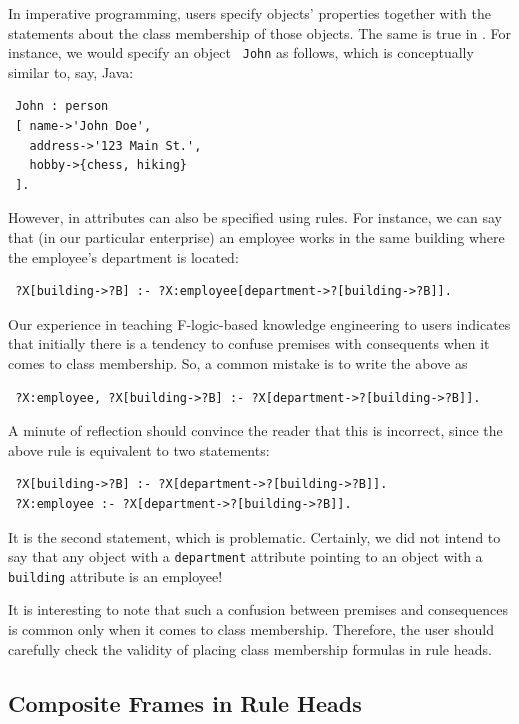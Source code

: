 \documentclass[11pt]{article}
\newcommand{\ERGO}{\mbox{\smaller{\ensuremath{\cal{E}}\smaller{{\sc{RGO}}}}}\xspace}
\newcommand{\FLSYSTEM}{\ERGO}
\begin{document}
In imperative programming, users specify objects' properties together with
the statements about the class membership of those objects.
The same is true in \FLSYSTEM. For instance, we would specify an object {\tt
  John} as follows, which is conceptually similar to, say, Java:
\begin{verbatim}
 John : person
 [ name->'John Doe',
   address->'123 Main St.',
   hobby->{chess, hiking}
 ].
\end{verbatim}
However, in \FLSYSTEM attributes can also be specified using rules. For
instance, we can say that (in our particular enterprise)
an employee works in the same building where the employee's department is
located:
\begin{verbatim}
 ?X[building->?B] :- ?X:employee[department->?[building->?B]].  
\end{verbatim}
Our experience in teaching F-logic-based knowledge engineering
to users indicates that
initially there is a tendency to confuse premises with consequents when it
comes to class membership. So, a common mistake is to write the above as
\begin{verbatim}
 ?X:employee, ?X[building->?B] :- ?X[department->?[building->?B]].  
\end{verbatim}
A minute of reflection should convince the reader that this is incorrect, since
the above rule is equivalent to two statements:
\begin{verbatim}
 ?X[building->?B] :- ?X[department->?[building->?B]].  
 ?X:employee :- ?X[department->?[building->?B]].
\end{verbatim}
It is the second statement, which is problematic. Certainly, we did not
intend to say that any object with a {\tt department} attribute pointing to
an object with a {\tt building} attribute is an employee!

It is interesting to note that such a confusion between premises and
consequences is common only when it comes to class membership. Therefore,
the user should carefully check the validity of placing class membership
formulas in rule heads.

\subsection{Composite Frames in Rule Heads}
\end{document}
